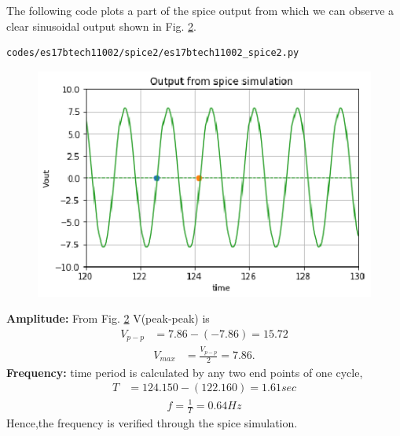 \begin{enumerate}[label=\arabic*.,ref=\theenumi]
\begin{figure}[!ht]
\caption{}
\label{fig:es17btech11002_spice}
\end{figure}
%
The following code plots a part of the spice output from which we can observe a clear sinusoidal output shown in Fig. \ref{fig:es17btech11002_spice2}.
\begin{lstlisting}
codes/es17btech11002/spice2/es17btech11002_spice2.py
\end{lstlisting}
\begin{figure}[!ht]
\centering
\includegraphics[width=\columnwidth]{./figs/es17btech11002/es17btech11002_2_spice2.eps}
\caption{}
\label{fig:es17btech11002_spice2}
\end{figure}
\renewcommand{\thefigure}{\theenumi}

\textbf{Amplitude:} From Fig. \ref{fig:es17btech11002_spice2} V(peak-peak) is 
\begin{align}
V_{p-p} &= 7.86-(-7.86) = 15.72
\end{align}
\begin{align}
V_{max} &= \frac{V_{p-p}}{2} = 7.86.
\end{align}
\textbf{Frequency:} time period is calculated by any two end points of one cycle,
\begin{align}
T&=124.150-(122.160) = 1.61 sec
\end{align}
\begin{align}
f = \frac{1}{T} = 0.64 Hz
\end{align}
Hence,the frequency is verified through the spice simulation.
\begin{table}[!ht]
\centering

\caption{}
\label{table:es17btech11002_Input_Table2}
\end{table}
\renewcommand{\thefigure}{\theenumi.\arabic{figure}}



\end{enumerate}
